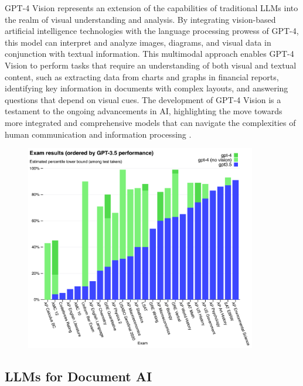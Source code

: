 \documentclass[english, 12pt, a4paper, elec, utf8, a-2b, online]{aaltothesis}
\begin{document}
GPT-4 Vision represents an extension of the capabilities of traditional \ac{LLM}s into the realm of visual understanding and analysis.
By integrating vision-based artificial intelligence technologies with the language processing prowess of GPT-4, this model can interpret and analyze images, diagrams, and visual data in conjunction with textual information.
This multimodal approach enables GPT-4 Vision to perform tasks that require an understanding of both visual and textual content, such as extracting data from charts and graphs in financial reports, identifying key information in documents with complex layouts, and answering questions that depend on visual cues.
The development of GPT-4 Vision is a testament to the ongoing advancements in \ac{AI}, highlighting the move towards more integrated and comprehensive models that can navigate the complexities of human communication and information processing \cite{2023GPT4VisionSC}.

\begin{figure}[H]
    \centering
    \includegraphics[width=0.9\textwidth]{images/gpt_exam_results.png}
    \caption{}
    \label{fig:gpt_exam_results}
\end{figure}

\subsection{LLMs for Document AI}
\end{document}
